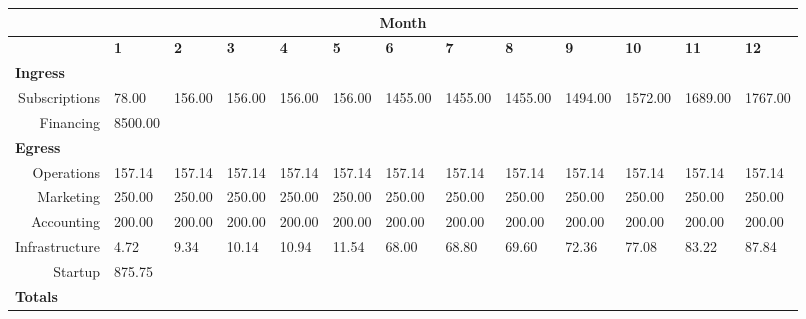\begin{sidewaystable}
\begin{table}[H]

  \begin{tabularx}{\textwidth}{X X X X X X X X X X X X X}

    \multicolumn{13}{c}{\textbf{Month}} \\

    \hline
    
    \multicolumn{1}{c}{} & \textbf{1} & \textbf{2} & \textbf{3} & \textbf{4} & \textbf{5} & \textbf{6} & \textbf{7} & \textbf{8} & \textbf{9} & \textbf{10} & \textbf{11} & \textbf{12}  \\

    \hline

    \multicolumn{13}{l}{\textbf{Ingress}} \\

    \hline

    \multicolumn{1}{r}{Subscriptions} & 78.00 & 156.00 & 156.00 & 156.00  & 156.00  & 1455.00  & 1455.00  & 1455.00  & 1494.00  & 1572.00  & 1689.00  & 1767.00  \\
    \multicolumn{1}{r}{Financing} & 8500.00 &  &  &  &  & &  &  &  &  &  &  \\

    \hline

    \multicolumn{13}{l}{\textbf{Egress}} \\

    \hline

    \multicolumn{1}{r}{Operations} & 157.14 & 157.14 & 157.14 & 157.14 & 157.14 & 157.14 & 157.14 & 157.14 & 157.14 & 157.14 & 157.14 & 157.14  \\
    \multicolumn{1}{r}{Marketing} & 250.00 & 250.00 & 250.00 & 250.00 & 250.00 & 250.00 & 250.00 & 250.00 & 250.00 & 250.00 & 250.00 & 250.00  \\
    \multicolumn{1}{r}{Accounting} & 200.00 & 200.00 & 200.00 & 200.00 & 200.00 & 200.00 & 200.00 & 200.00 & 200.00 & 200.00 & 200.00 & 200.00  \\
    \multicolumn{1}{r}{Infrastructure} & 4.72 & 9.34 & 10.14 & 10.94 & 11.54 & 68.00 & 68.80 & 69.60 & 72.36 & 77.08 & 83.22 & 87.84  \\
    \multicolumn{1}{r}{Startup} & 875.75 &  &  &  &  &  &  &  &  &  &  &   \\

    \hline

    \multicolumn{13}{l}{\textbf{Totals}} \\


\end{tabularx}
\end{table}
\end{sidewaystable}
